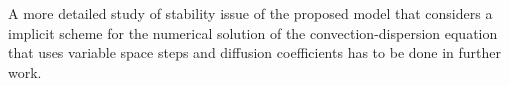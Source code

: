 
A more detailed study of stability issue of the proposed model that considers a implicit scheme for the numerical solution of the convection-dispersion equation that uses variable space steps and diffusion coefficients has to be done in further work.

% 
%
%
%








